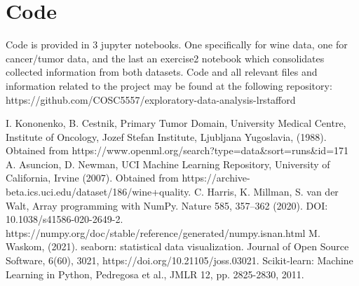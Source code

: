 \documentclass[titlepage]{article}
\begin{document}
\section*{Code}
Code is provided in 3 jupyter notebooks.  One specifically for wine data, one for cancer/tumor data, and the last an exercise2 notebook which consolidates collected information from both datasets.   Code and all relevant files and information related to the project may be found at the following repository:  https://github.com/COSC5557/exploratory-data-analysis-lrstafford 

\begin{thebibliography}{9}
		 I. Kononenko, B. Cestnik,  Primary Tumor Domain, University Medical Centre, Institute of Oncology, Jozef Stefan Institute, Ljubljana Yugoslavia, (1988). Obtained from https://www.openml.org/search?type=data\&sort=runs\&id=171
		 A. Asuncion, D. Newman, UCI Machine Learning Repository, University of California, Irvine  (2007).  Obtained from https://archive-beta.ics.uci.edu/dataset/186/wine+quality. 
		 C. Harris, K. Millman, S. van der Walt,  Array programming with NumPy. Nature 585, 357–362 (2020). DOI: 10.1038/s41586-020-2649-2.  https://numpy.org/doc/stable/reference/generated/numpy.isnan.html
		 M. Waskom, (2021). seaborn: statistical data visualization. Journal of Open Source Software, 6(60), 3021, https://doi.org/10.21105/joss.03021.
		Scikit-learn: Machine Learning in Python, Pedregosa et al., JMLR 12, pp. 2825-2830, 2011. 
\end{thebibliography}
\end{document}
